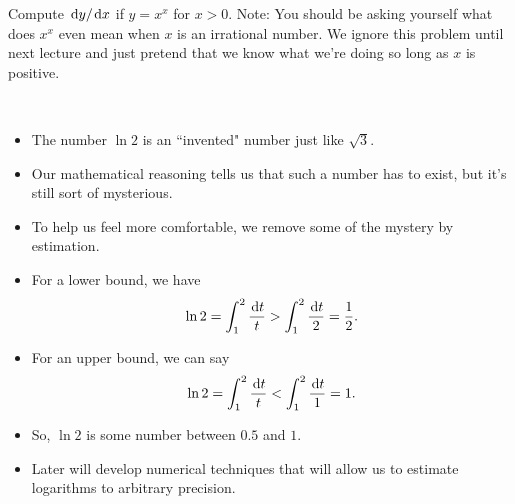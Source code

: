 \begin{example}
Compute $\mkern 2mu \mathrm{d} y/\mkern 2mu \mathrm{d} x$ if $y=x^x$ for $x>0$.
Note: You should be asking yourself what does $x^x$ even mean when $x$ is an irrational number.
We ignore this problem until next lecture and just pretend that we know what we're doing so long as $x$ is positive.
\end{example}
\ifdefined\SOLUTION
{}
\else
\vfill
\fi

\newpage

\begin{remark}\,
\begin{itemize}
\item The number $\ln 2$ is an ``invented" number just like $\sqrt 3$.
\item Our mathematical reasoning tells us that such a number has to exist, but it's still sort of mysterious.
\item To help us feel more comfortable, we remove some of the mystery by estimation.
\item For a lower bound, we have
    \begin{equation*}
        \ln 2 
		= \int_{1}^{2} \frac{\mkern 2mu \mathrm{d} t}{t} 
		>\int_1^2\frac{\mkern 2mu \mathrm{d} t}{2}
		= \frac{1}{2}.
    \end{equation*} 
\item For an upper bound, we can say
    \begin{equation*}
        \ln 2 
		= \int_{1}^{2} \frac{\mkern 2mu \mathrm{d} t}{t} 
		<\int_1^2\frac{\mkern 2mu \mathrm{d} t}{1}
		= 1.
    \end{equation*} 
\item So, $\ln 2$ is some number between $0.5$ and $1$.
\item Later will develop numerical techniques that will allow us to estimate logarithms to arbitrary precision.
\end{itemize}
\end{remark}


